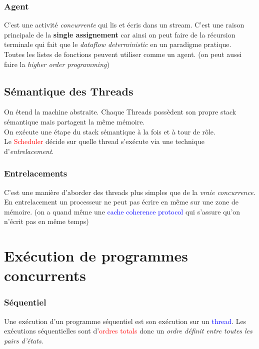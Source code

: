 \documentclass{report}
\begin{document}
\subsubsection{Agent}
C'est une activité \textit{concurrente} qui lis et écris dans un stream. C'est une raison principale de la \textbf{single assignement} car ainsi on peut faire de la récursion terminale qui fait que le \textit{dataflow deterministic} en un paradigme pratique.\\
Toutes les listes de fonctions peuvent utiliser comme un agent. (on peut aussi faire la \textit{higher order programming})

\subsection{Sémantique des Threads}
On étend la machine abstraite. Chaque Threads possèdent son propre stack sémantique mais partagent la même mémoire.\\
On exécute une étape du stack sémantique à la fois et à tour de rôle.\\
Le \textcolor{red}{Scheduler} décide sur quelle thread s'exécute via une technique d'\textit{entrelacement}.

\subsubsection{Entrelacements}
C'est une manière d'aborder des threads plus simples que de la \textit{vraie concurrence}. En entrelacement un processeur ne peut pas écrire en même sur une zone de mémoire. (on a quand même une \textcolor{blue}{cache coherence protocol} qui s'assure qu'on n'écrit pas en même temps)

\section{Exécution de programmes concurrents}

\subsubsection{Séquentiel}
Une exécution d'un programme séquentiel est son exécution sur un \textcolor{blue}{thread}. Les exécutions séquentielles sont d'\textcolor{red}{ordres totals} donc un \textit{ordre définit entre toutes les pairs d'états}.
\end{document}
